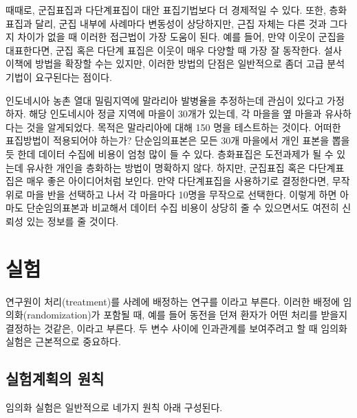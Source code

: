때때로, 군집표집과 다단계표집이 대안 표집기법보다 더 경제적일 수 있다.
또한, 층화표집과 달리, 군집 내부에 사례마다 변동성이 상당하지만, 근집 자체는 다른 것과 그다지 차이가 없을 때 이러한 접근법이 가장 도움이 된다. 예를 들어, 만약 이웃이 군집을 대표한다면, 군집 혹은 다단계 표집은 이웃이 매우 다양할 때 가장 잘 동작한다.
설사 이책에 방법을 확장할 수는 있지만, 이러한 방법의 단점은 일반적으로 좀더 고급 분석기법이 요구된다는 점이다.

\begin{example}{인도네시아 농촌 열대 밀림지역에 말라리아 발병율을 추정하는데 관심이 있다고 가정하자.
해당 인도네시아 정글 지역에 마을이 30개가 있는데, 각 마을을 옆 마을과 유사하다는 것을 알게되었다.
목적은 말라리아에 대해 150 명을 테스트하는 것이다. 어떠한 표집방법이 적용되어야 하는가?}
단순임의표본은 모든 30개 마을에서 개인 표본을 뽑을 듯 한데 데이터 수집에 비용이 엄청 많이 들 수 있다.
층화표집은 도전과제가 될 수 있는데 유사한 개인을 층화하는 방법이 명확하지 않다.
하지만, 군집표집 혹은 다단계표집은 매우 좋은 아이디어처럼 보인다.
만약 다단계표집을 사용하기로 결정한다면, 무작위로 마을 반을 선택하고 나서 각 마을마다 10명을 무작으로 선택한다.
이렇게 하면 아마도 단순임의표본과 비교해서 데이터 수집 비용이 상당히 줄 수 있으면서도 여전히 신뢰성 있는 정보를 줄 것이다.
\end{example}


\section[Experiments]{실험 }
\label{experimentsSection}

연구원이 처리(treatment)를 사례에 배정하는 연구를 이라고 부른다.
이러한 배정에 임의화(randomization)가 포함될 때, 예를 들어 동전을 던져 환자가 어떤 처리를 받을지 결정하는 것같은,
이라고 부른다. 두 변수 사이에 인과관계를 보여주려고 할 때 임의화 실험은 근본적으로 중요하다.

\subsection{실험계획의 원칙}
\label{experimentalDesignPrinciples}

임의화 실험은 일반적으로 네가지 원칙 아래 구성된다.

